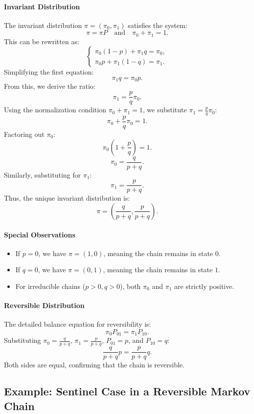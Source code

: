 \paragraph{Invariant Distribution}
The invariant distribution \( \pi = (\pi_0, \pi_1) \) satisfies the system:
\[
\pi = \pi P \quad \text{and} \quad \pi_0 + \pi_1 = 1.
\]
This can be rewritten as:
\[
\begin{cases}
\pi_0 (1 - p) + \pi_1 q = \pi_0, \\
\pi_0 p + \pi_1 (1 - q) = \pi_1.
\end{cases}
\]
Simplifying the first equation:
\[
\pi_1 q = \pi_0 p.
\]
From this, we derive the ratio:
\[
\pi_1 = \frac{p}{q} \pi_0.
\]
Using the normalization condition \( \pi_0 + \pi_1 = 1 \), we substitute \( \pi_1 = \frac{p}{q} \pi_0 \):
\[
\pi_0 + \frac{p}{q} \pi_0 = 1.
\]
Factoring out \( \pi_0 \):
\[
\pi_0 \left( 1 + \frac{p}{q} \right) = 1.
\]
\[
\pi_0 = \frac{q}{p + q}.
\]
Similarly, substituting for \( \pi_1 \):
\[
\pi_1 = \frac{p}{p + q}.
\]
Thus, the unique invariant distribution is:
\[
\pi = \left( \frac{q}{p+q}, \frac{p}{p+q} \right).
\]

\paragraph{Special Observations}
\begin{itemize}
    \item If \( p = 0 \), we have \( \pi = (1, 0) \), meaning the chain remains in state \( 0 \).
    \item If \( q = 0 \), we have \( \pi = (0, 1) \), meaning the chain remains in state \( 1 \).
    \item For irreducible chains (\( p > 0, q > 0 \)), both \( \pi_0 \) and \( \pi_1 \) are strictly positive.
\end{itemize}

\paragraph{Reversible Distribution}
The detailed balance equation for reversibility is:
\[
\pi_0 P_{01} = \pi_1 P_{10}.
\]
Substituting \( \pi_0 = \frac{q}{p+q} \), \( \pi_1 = \frac{p}{p+q} \), \( P_{01} = p \), and \( P_{10} = q \):
\[
\frac{q}{p+q} p = \frac{p}{p+q} q.
\]
Both sides are equal, confirming that the chain is reversible.

\subsection{Example: Sentinel Case in a Reversible Markov Chain}


